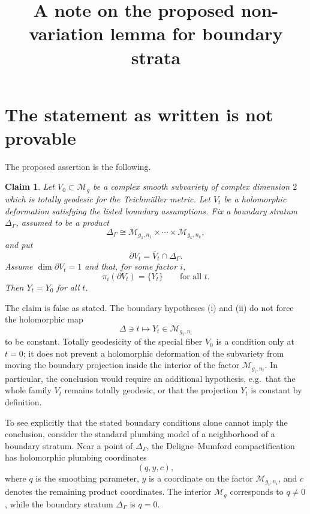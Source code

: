 \documentclass{article}
\newtheorem{claim}[theorem]{Claim}
\begin{document}
\title{A note on the proposed non-variation lemma for boundary strata}
\author{}
\date{}
\maketitle

\section{The statement as written is not provable}

The proposed assertion is the following.

\begin{claim}
Let \(V_0\subset \mathcal M_g\) be a complex smooth subvariety of complex dimension \(2\) which is totally geodesic for the Teichm\"uller metric. Let \(V_t\) be a holomorphic deformation satisfying the listed boundary assumptions. Fix a boundary stratum \(\Delta_\Gamma\), assumed to be a product
\[
\Delta_\Gamma \cong \mathcal M_{g_1,n_1}\times\cdots\times \mathcal M_{g_k,n_k},
\]
and put
\[
\partial V_t = \overline V_t\cap \Delta_\Gamma .
\]
Assume \(\dim \partial V_t=1\) and that, for some factor \(i\),
\[
\pi_i(\partial V_t)=\{Y_t\}\qquad\text{for all }t.
\]
Then \(Y_t=Y_0\) for all \(t\).
\end{claim}

The claim is false as stated. The boundary hypotheses (i) and (ii) do not force the holomorphic map
\[
\Delta\ni t\longmapsto Y_t\in \mathcal M_{g_i,n_i}
\]
to be constant. Totally geodesicity of the special fiber \(V_0\) is a condition only at \(t=0\); it does not prevent a holomorphic deformation of the subvariety from moving the boundary projection inside the interior of the factor \(\mathcal M_{g_i,n_i}\). In particular, the conclusion would require an additional hypothesis, e.g.\ that the whole family \(V_t\) remains totally geodesic, or that the projection \(Y_t\) is constant by definition.

To see explicitly that the stated boundary conditions alone cannot imply the conclusion, consider the standard plumbing model of a neighborhood of a boundary stratum. Near a point of \(\Delta_\Gamma\), the Deligne--Mumford compactification has holomorphic plumbing coordinates
\[
(q,y,c),
\]
where \(q\) is the smoothing parameter, \(y\) is a coordinate on the factor \(\mathcal M_{g_i,n_i}\), and \(c\) denotes the remaining product coordinates. The interior \(\mathcal M_g\) corresponds to \(q\neq 0\), while the boundary stratum \(\Delta_\Gamma\) is \(q=0\).
\end{document}
